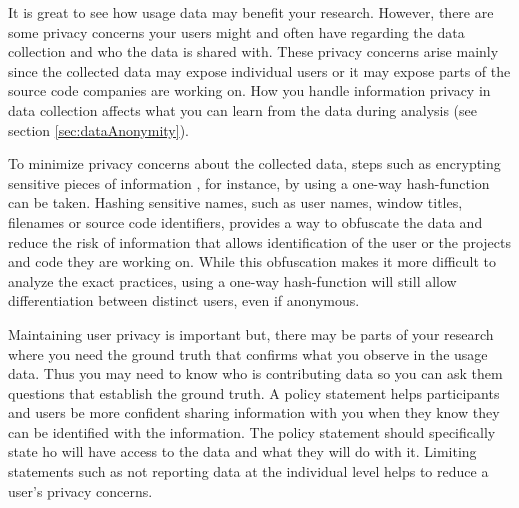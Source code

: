 It is great to see how usage data may benefit your research. However, there are some privacy concerns your users might and often have regarding the data collection and who the data is shared with. These privacy concerns arise mainly since the collected data may expose individual users or it may expose parts of the source code companies are working on.  How you handle information privacy in data collection affects what you can learn from the data during analysis (see section \ref{sec:dataAnonymity}).


To minimize privacy concerns about the collected data, steps such as encrypting sensitive pieces of information , for instance, by using a one-way hash-function can be taken. Hashing sensitive names, such as user names, window titles, filenames or source code identifiers, provides a way to obfuscate the data and reduce the risk of information that allows identification of the user or the projects and code they are working on. While this obfuscation makes it more difficult to analyze the exact practices, using a one-way hash-function will still allow differentiation between distinct users, even if anonymous.


Maintaining user privacy is important but, there may be parts of your research where you need the ground truth that confirms what you observe in the usage data.  Thus you may need to know who is contributing data so you can ask them questions that establish the ground truth. A policy statement helps participants and users be more confident sharing information with you when they know they can be identified with the information.  The policy statement should specifically state ho will have access to the data and what they will do with it. Limiting statements such as not reporting data at the individual level helps to reduce a user's privacy concerns.
